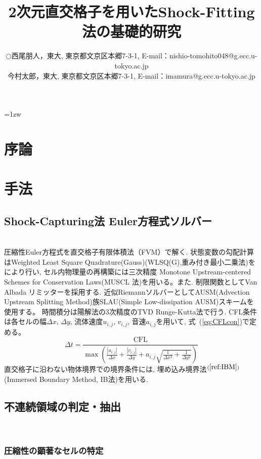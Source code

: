 \documentclass[a4j]{jarticle}
\title{2次元直交格子を用いたShock-Fitting法の基礎的研究}   %
\author{\begin{tabular}{cl}
$\bigcirc$ & 西尾朋人，東大, 
             東京都文京区本郷7-3-1, 
             E-mail：nishio-tomohito048@g.ecc.u-tokyo.ac.jp \\
           & 今村太郎，東大,
             東京都文京区本郷7-3-1, 
             E-mail：imamura@g.ecc.u-tokyo.ac.jp
\end{tabular} }
\begin{document}
\baselineskip=1zw
\maketitle

\section{序論} \label{sec:intro}

\section{手法} \label{sec:method}

\subsection{Shock-Capturing法 Euler方程式ソルバー} \label{subsec:sc}
\mbox{}\\[-3.0ex]

圧縮性Euler方程式を直交格子有限体積法（FVM）で解く.
状態変数の勾配計算はWeighted Least Square Quadrature(Gauss)(WLSQ(G),重み付き最小二乗法)をにより行い, セル内物理量の再構築には三次精度 Monotone Upstream-centered
Schemes for Conservation Laws(MUSCL 法)を用いる。また. 制限関数としてVan Albada リミッターを採用する.
近似RiemannソルバーとしてAUSM(Advection Upstream Splitting Method)族SLAU(Simple Low-dissipation AUSM)スキームを使用する。
時間積分は陽解法の3次精度のTVD Runge-Kutta法で行う.
CFL条件は各セルの幅$\Delta x$, $\Delta y$, 流体速度$u_{i,j}$, $v_{i,j}$, 音速$a_{i, j}$を用いて, 式~(\ref{eq:CFLcon})で定める。
\begin{equation}
    \Delta t =
    \frac{\mathrm{CFL}}{
        \max\left(
            \frac{|u_{i,j}|}{\Delta x}
            + \frac{|v_{i,j}|}{\Delta y}
            + a_{i,j}
              \sqrt{
                \frac{1}{\Delta x^2}
                + \frac{1}{\Delta y^2}
              }
        \right)
    }
    \label{eq:CFLcon}
\end{equation}
直交格子に沿わない物体境界での境界条件には, 埋め込み境界法$^{(\ref{ref:IBM})}$(Immersed Boundary Method, IB法)を用いる.

\subsection{不連続領域の判定・抽出} \label{subsec:discon}
\mbox{}\\[-6.0ex]
\subsubsection{圧縮性の顕著なセルの特定} \label{subsubsec:comp}
\mbox{}\\[-1.0ex]
\end{document}
